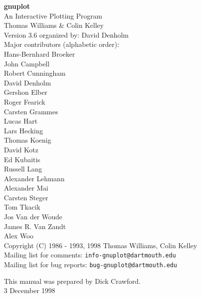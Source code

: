 \documentclass{article} %
\begin{document}
\sloppy
\pagestyle{empty}
   \rule{0in}{2.0in}
   \begin{center}
   {\huge\bf gnuplot}\\
   \vspace{3ex}
   {\Large An Interactive Plotting Program}\\
   \vspace{2ex}
   \large
   Thomas Williams \& Colin Kelley\\
   \vspace{2ex}
   Version 3.6 organized by: David Denholm \\
   \vspace{2ex}
   Major contributors (alphabetic order):\\
  Hans-Bernhard Broeker \\
  John Campbell\\
  Robert Cunningham\\
  David Denholm\\
  Gershon Elber\\
  Roger Fearick\\
  Carsten Grammes\\
  Lucas Hart \\
  Lars Hecking \\
  Thomas Koenig\\
  David Kotz\\
  Ed Kubaitis\\
  Russell Lang\\
  Alexander Lehmann\\
  Alexander Mai \\
  Carsten Steger\\
  Tom Tkacik\\
  Jos Van der Woude \\
  James R. Van Zandt \\
  Alex Woo\\
  Copyright (C) 1986 - 1993, 1998   Thomas Williams, Colin Kelley\\
   \vspace{2ex}
   Mailing list for comments: \verb+info-gnuplot@dartmouth.edu+\\
   Mailing list for bug reports: \verb+bug-gnuplot@dartmouth.edu+

   \vfill
   This manual was prepared by Dick Crawford. \\
   3 December 1998
   \end{center}
\newpage

\tableofcontents
\newpage



\setcounter{page}{1}
\pagestyle{myheadings}
\end{document}
